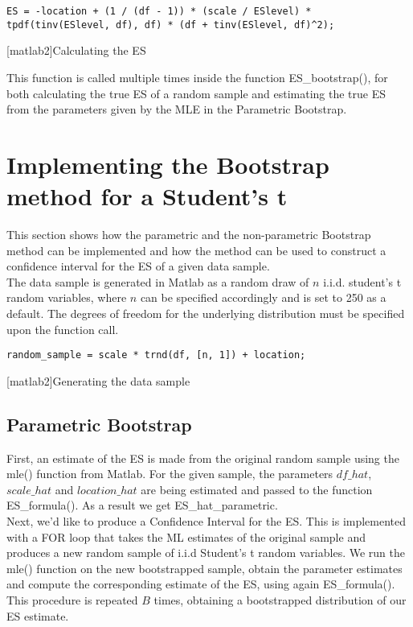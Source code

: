 \documentclass[11pt, a4paper]{article}
\begin{document}
\begin{lstlisting}[style=Matlab-editor]
%% True ES
ES = -location + (1 / (df - 1)) * (scale / ESlevel) * tpdf(tinv(ESlevel, df), df) * (df + tinv(ESlevel, df)^2);
\end{lstlisting}
\label{True ES function}
[matlab2]{Calculating the ES\\}

This function is called multiple times inside the function ES\_bootstrap(), for both calculating the true ES of a random sample and estimating the true ES from the parameters given by the MLE in the Parametric Bootstrap. 

\section{Implementing the Bootstrap method for a Student's t}
This section shows how the parametric and the non-parametric Bootstrap method can be implemented and how the method can be used to construct a confidence interval for the ES of a given data sample. \\

The data sample is generated in Matlab as a random draw of $n$ i.i.d. student's t random variables, where $n$ can be specified accordingly and is set to 250 as a default. The degrees of freedom for the underlying distribution must be specified upon the function call.

\begin{lstlisting}[style=Matlab-editor]
%% Generate the random iid sample:
random_sample = scale * trnd(df, [n, 1]) + location;
\end{lstlisting}
\label{Generating the data sample}
[matlab2]{Generating the data sample\\}

\subsection{Parametric Bootstrap}
First, an estimate of the ES is made from the original random sample using the mle() function from Matlab. For the given sample, the parameters $df\_hat$, $scale\_hat$ and $location\_hat$ are being estimated and passed to the function ES\_formula(). As a result we get ES\_hat\_parametric. \\

Next, we'd like to produce a Confidence Interval for the ES. This is implemented with a FOR loop that takes the ML estimates of the original sample and produces a new random sample of i.i.d Student's t random variables. We run the mle() function on the new bootstrapped sample, obtain the parameter estimates and compute the corresponding estimate of the ES, using again ES\_formula(). This procedure is repeated $B$ times, obtaining a bootstrapped distribution of our ES estimate. \newpage
\end{document}
